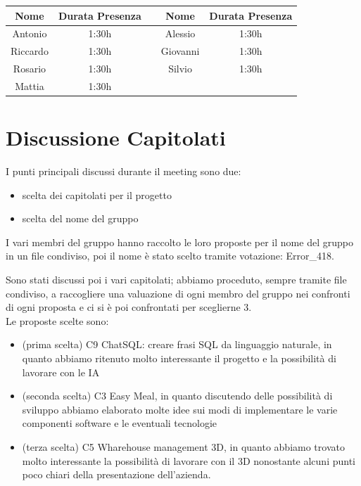 \documentclass[12pt,a4paper]{article}
\begin{document}
\begin{center}
    \begin{tabular}{ |c|c|c|c|c| }
        \hline
        Nome     & Durata Presenza &  & Nome     & Durata Presenza \\
        \hline
        Antonio  & 1:30h           &  & Alessio  & 1:30h           \\
        \hline
        Riccardo & 1:30h           &  & Giovanni & 1:30h           \\
        \hline
        Rosario  & 1:30h           &  & Silvio   & 1:30h           \\
        \hline
        Mattia   & 1:30h           &  &          &                 \\
        \hline

    \end{tabular}
\end{center}

\newpage

\section{Discussione Capitolati}
I punti principali discussi durante il meeting sono due:
\begin{itemize}
    \item scelta dei capitolati per il progetto
    \item scelta del nome del gruppo
\end{itemize}

I vari membri del gruppo hanno raccolto le loro proposte per il nome del gruppo
in
un file condiviso, poi il nome è stato scelto tramite votazione: Error\_418.

Sono stati discussi poi i vari capitolati; abbiamo proceduto, sempre tramite
file
condiviso, a raccogliere una valuazione di ogni membro del gruppo nei confronti
di ogni proposta e ci si è poi confrontati per sceglierne 3.\\
Le proposte scelte sono:
\begin{itemize}
    \item (prima scelta) C9 ChatSQL: creare frasi SQL da linguaggio naturale,
          in
          quanto abbiamo ritenuto molto interessante il progetto e la
          possibilità di
          lavorare con le IA

    \item (seconda scelta) C3 Easy Meal, in quanto discutendo delle possibilità
          di
          sviluppo abbiamo elaborato molte idee sui modi di implementare le
          varie
          componenti software e le eventuali tecnologie
    \item (terza scelta) C5 Wharehouse management 3D, in quanto abbiamo trovato
          molto
          interessante la possibilità di lavorare con il 3D nonostante alcuni
          punti poco
          chiari della presentazione dell'azienda.
\end{itemize}
\end{document}
